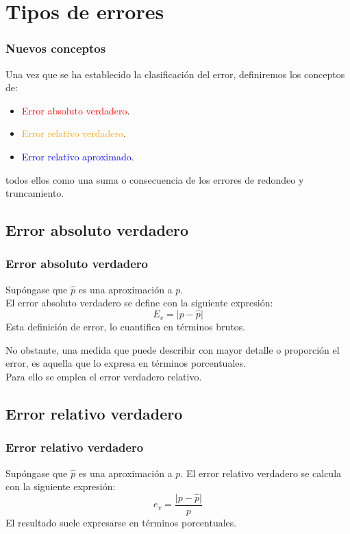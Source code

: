 \section{Tipos de errores}
\begin{frame}
\frametitle{Nuevos conceptos}
Una vez que se ha establecido la clasificación del error, definiremos los conceptos de:
\begin{itemize}
\item \textcolor{red}{Error absoluto verdadero}.
\item \textcolor{orange}{Error relativo verdadero}.
\item \textcolor{blue}{Error relativo aproximado}.
\end{itemize}
todos ellos como una suma o consecuencia de los errores de redondeo y truncamiento.
\end{frame}
\subsection{Error absoluto verdadero}
\begin{frame}
\frametitle{Error absoluto verdadero}
Supóngase que $\widehat{p}$ es una aproximación a $p$.
\\
\bigskip
El error absoluto verdadero se define con la siguiente expresión:
\[ E_{v} = \vert p - \widehat{p} \vert \]
Esta definición de error, lo cuantifica en términos brutos. 
\end{frame}
\begin{frame}
No obstante, una medida que puede describir con mayor detalle o proporción el error, es aquella que lo expresa en términos porcentuales. 
\\
\bigskip
Para ello se emplea el error verdadero relativo.
\end{frame}
\subsection{Error relativo verdadero}
\begin{frame}
\frametitle{Error relativo verdadero}
Supóngase que $\widehat{p}$ es una aproximación a $p$. El error relativo verdadero se calcula con la siguiente expresión:
\[ e_{v} = \dfrac{\vert p - \widehat{p} \vert }{p}\]
El resultado suele expresarse en términos porcentuales.
\end{frame}
